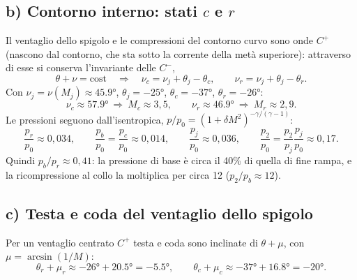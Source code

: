 \documentclass[11pt,a4paper]{article}
\newcommand{\Cp}{C^{+}}
\newcommand{\Cm}{C^{-}}
\begin{document}
\subsection*{b) Contorno interno: stati $c$ e $r$}
Il ventaglio dello spigolo e le compressioni del contorno curvo sono onde $\Cp$ (nascono dal contorno, che sta sotto
la corrente della metà superiore): attraverso di esse si conserva l'invariante delle $\Cm$,
\[
\theta+\nu=\text{cost}\quad\Rightarrow\quad
\nu_c=\nu_j+\theta_j-\theta_c,\qquad \nu_r=\nu_j+\theta_j-\theta_r .
\]
Con $\nu_j=\nu(M_j)\approx\ang{45.9}$, $\theta_j=\ang{-25}$, $\theta_c=\ang{-37}$, $\theta_r=\ang{-26}$:
\[
\nu_c\approx\ang{57.9}\ \Rightarrow\ M_c\approx3{,}5,\qquad
\nu_r\approx\ang{46.9}\ \Rightarrow\ M_r\approx2{,}9 .
\]
Le pressioni seguono dall'isentropica, $p/p_0=(1+\delta M^2)^{-\gamma/(\gamma-1)}$:
\[
\frac{p_r}{p_0}\approx0{,}034,\qquad \frac{p_b}{p_0}=\frac{p_c}{p_0}\approx0{,}014,\qquad
\frac{p_j}{p_0}\approx0{,}036,\qquad \frac{p_2}{p_0}=\frac{p_2}{p_j}\frac{p_j}{p_0}\approx0{,}17 .
\]
Quindi $p_b/p_r\approx0{,}41$: la pressione di base è circa il 40\% di quella di fine rampa, e la ricompressione al
collo la moltiplica per circa 12 ($p_2/p_b\approx12$).

\subsection*{c) Testa e coda del ventaglio dello spigolo}
Per un ventaglio centrato $\Cp$ testa e coda sono inclinate di $\theta+\mu$, con $\mu=\arcsin(1/M)$:
\[
\theta_r+\mu_r\approx\ang{-26}+\ang{20.5}=\ang{-5.5},\qquad
\theta_c+\mu_c\approx\ang{-37}+\ang{16.8}=\ang{-20} .
\]

\end{document}
